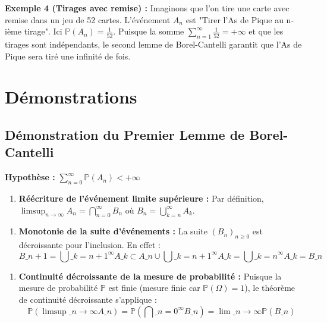 \documentclass[11pt,a4paper]{article}
\begin{document}
\vspace{0.5cm}
\begin{center}
\end{center}
\vspace{0.5cm}



\textbf{Exemple 4 (Tirages avec remise) :}
Imaginons que l'on tire une carte avec remise dans un jeu de 52 cartes. L'événement $A_n$ est "Tirer l'As de Pique au n-ième tirage".
Ici $\mathbb{P}(A_n) = \frac{1}{52}$.
Puisque la somme $\sum_{n=1}^\infty \frac{1}{52} = +\infty$ et que les tirages sont indépendants, le second lemme de Borel-Cantelli garantit que l'As de Pique sera tiré une infinité de fois.


\section{Démonstrations}

\subsection{Démonstration du Premier Lemme de Borel-Cantelli}

\textbf{Hypothèse :} $\sum_{n=0}^\infty \mathbb{P}(A_n) < +\infty$

\begin{enumerate}
\item \textbf{Réécriture de l'événement limite supérieure :}
   Par définition, $\limsup_{n \to \infty} A_n = \bigcap_{n=0}^\infty B_n$ où $B_n = \bigcup_{k=n}^\infty A_k$.
\end{enumerate}

\begin{enumerate}
\item \textbf{Monotonie de la suite d'événements :}
   La suite $(B_n)_{n \ge 0}$ est décroissante pour l'inclusion. En effet :
   $$ B\_{n+1} = \bigcup\_{k=n+1}^\infty A\_k \subset A\_n \cup \bigcup\_{k=n+1}^\infty A\_k = \bigcup\_{k=n}^\infty A\_k = B\_n $$
\end{enumerate}

\begin{enumerate}
\item \textbf{Continuité décroissante de la mesure de probabilité :}
   Puisque la mesure de probabilité $\mathbb{P}$ est finie (mesure finie car $\mathbb{P}(\Omega) = 1$), le théorème de continuité décroissante s'applique :
   $$ \mathbb{P}\left( \limsup\_{n \to \infty} A\_n \right) = \mathbb{P}\left( \bigcap\_{n=0}^\infty B\_n \right) = \lim\_{n \to \infty} \mathbb{P}(B\_n) $$
\end{enumerate}
\end{document}
